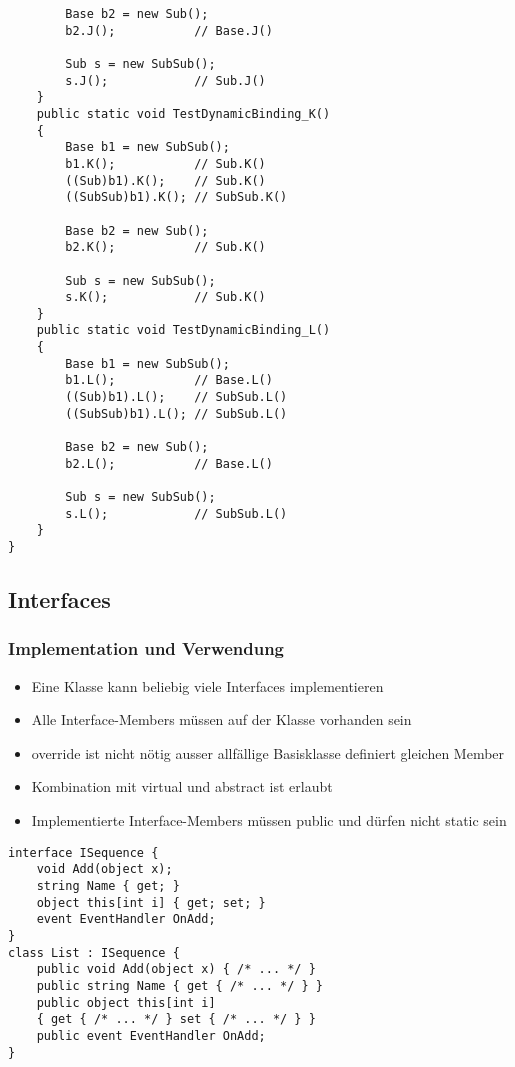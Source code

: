 \begin{multicols*}{2}
\begin{lstlisting}
        Base b2 = new Sub();
        b2.J();           // Base.J()  

        Sub s = new SubSub();
        s.J();            // Sub.J()
    }
    public static void TestDynamicBinding_K()
    {
        Base b1 = new SubSub();
        b1.K();           // Sub.K()
        ((Sub)b1).K();    // Sub.K()
        ((SubSub)b1).K(); // SubSub.K()

        Base b2 = new Sub();
        b2.K();           // Sub.K()  

        Sub s = new SubSub();
        s.K();            // Sub.K()
    }
    public static void TestDynamicBinding_L()
    {
        Base b1 = new SubSub();
        b1.L();           // Base.L()
        ((Sub)b1).L();    // SubSub.L()
        ((SubSub)b1).L(); // SubSub.L()

        Base b2 = new Sub();
        b2.L();           // Base.L()  

        Sub s = new SubSub();
        s.L();            // SubSub.L()
    }
}
\end{lstlisting}

\subsection{Interfaces}
\subsubsection{Implementation und Verwendung}
\begin{itemize}
    \item Eine Klasse kann beliebig viele Interfaces implementieren
    \item Alle Interface-Members müssen auf der Klasse vorhanden sein
    \item override ist nicht nötig ausser allfällige Basisklasse definiert gleichen Member
    \item Kombination mit virtual und abstract ist erlaubt
    \item Implementierte Interface-Members müssen public und dürfen nicht static sein
\end{itemize}
\begin{lstlisting}
interface ISequence {
    void Add(object x);
    string Name { get; }
    object this[int i] { get; set; }
    event EventHandler OnAdd;
}
class List : ISequence {
    public void Add(object x) { /* ... */ }
    public string Name { get { /* ... */ } }
    public object this[int i] 
    { get { /* ... */ } set { /* ... */ } }
    public event EventHandler OnAdd;
}


\end{lstlisting}
\end{multicols*}
